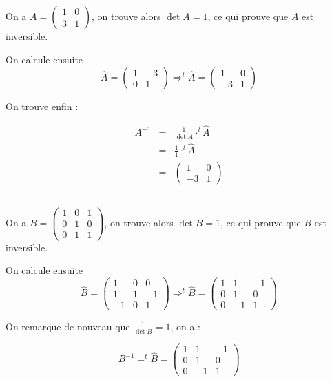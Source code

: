 \documentclass[a4paper, 11pt]{report} %
\begin{document}
On a $A = \begin{pmatrix} 1& 0\\ 3& 1 \end{pmatrix}$, on trouve alors $\det{A} = 1$,
ce qui prouve que $A$ est inversible.

On calcule ensuite 
\[
\hat{A} = 
\begin{pmatrix}
1& -3\\
0& 1
\end{pmatrix} \Rightarrow
^t\hat{A} = 
\begin{pmatrix}
1& 0\\
-3& 1
\end{pmatrix}
\]

On trouve enfin :

\begin{eqnarray*}
    A^{-1}  & = & \frac{1}{\det{A}}\cdot^t\hat{A}\\
            & = & \frac{1}{1}\cdot^t\hat{A}\\
            & = & \begin{pmatrix} 1& 0\\ -3& 1 \end{pmatrix}
\end{eqnarray*}

\subsection{}

On a $B = \begin{pmatrix} 1& 0& 1\\ 0& 1& 0\\0&1&1 \end{pmatrix}$, on trouve alors $\det{B} = 1$,
ce qui prouve que $B$ est inversible.

On calcule ensuite 
\[
\hat{B} = 
\begin{pmatrix}
1& 0& 0\\
1& 1& -1\\
-1& 0& 1
\end{pmatrix} \Rightarrow
^t\hat{B} = 
\begin{pmatrix}
1& 1& -1\\
0& 1& 0\\
0& -1& 1
\end{pmatrix}
\]

On remarque de nouveau que $\frac{1}{\det{B}} = 1$, on a :

\[
B^{-1} = ^t\hat{B} = 
\begin{pmatrix}
1& 1& -1\\
0& 1& 0\\
0& -1& 1
\end{pmatrix}
\]
\end{document}
